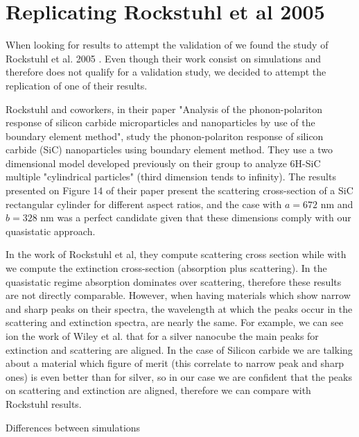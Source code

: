 
\chapter{Replicating Rockstuhl et al 2005} \label{chap:rep_rockstuhl}
\graphicspath{{replication_validation/figs/}}

When looking for results to attempt the validation of \pygbe we found the study of Rockstuhl et al. 2005 \cite{rockstuhl2005}. 
Even though their work consist on simulations and therefore does not qualify for a validation study, we decided to 
attempt the replication of one of their results. 

Rockstuhl and coworkers, in their paper "Analysis of the phonon-polariton response of silicon carbide microparticles 
and nanoparticles by use of the boundary element method", study the phonon-polariton response of silicon carbide (SiC)
nanoparticles using boundary element method. They use a two dimensional model developed previously on their group \cite{rockstuhl2003}
to analyze 6H-SiC multiple "cylindrical particles" (third dimension tends to infinity). The results presented on Figure 14 of their paper  
present the scattering cross-section of a SiC rectangular cylinder for different aspect ratios, and the case with $a = 672$ nm and $b = 328$ nm
was a perfect candidate given that these dimensions comply with our quasistatic approach.

In the work of Rockstuhl et al, they compute scattering cross section while with \pygbe we compute the extinction cross-section 
(absorption plus scattering). In the quasistatic regime absorption dominates over scattering, therefore these results are not directly
comparable. However, when having materials which show narrow and sharp peaks on their spectra, the wavelength at which the peaks occur 
in the scattering and extinction spectra, are nearly the same. For example, we can see ion the work of Wiley et al. \cite{wiley-etal-2006}
that for a silver nanocube the main peaks for extinction and scattering are aligned. In the case of Silicon carbide we are talking about a 
material which figure of merit (this correlate to narrow peak and sharp ones) is even better than for silver, so in our case we are confident that
the peaks on scattering and extinction are aligned, therefore we can compare with Rockstuhl results.

Differences between simulations


